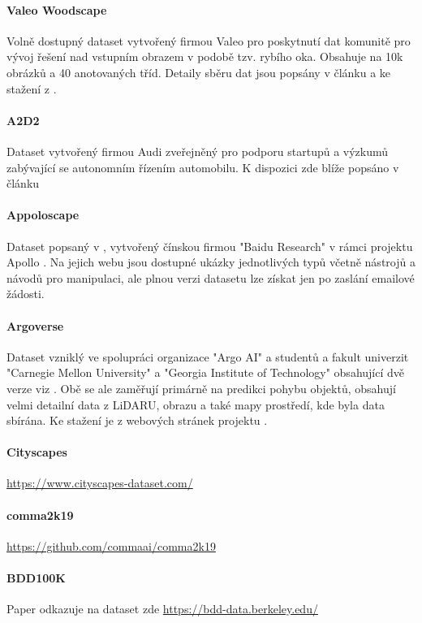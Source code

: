 \documentclass[czech, bc, kky, he, iso690numb]{fasthesis}
\begin{document}
    		\paragraph{Valeo Woodscape}
    			Volně dostupný dataset vytvořený firmou Valeo pro poskytnutí dat komunitě pro vývoj řešení nad vstupním obrazem v podobě tzv. rybího oka. Obsahuje na 10k obrázků a 40 anotovaných tříd. Detaily sběru dat jsou popsány v článku \cite{woodscape} a ke stažení z \cite{dataset_woodscape}.
    		\paragraph{A2D2}
    			Dataset vytvořený firmou Audi zveřejněný pro podporu startupů a výzkumů zabývající se autonomním řízením automobilu. K dispozici zde \cite{dataset_A2D2} blíže popsáno v článku \cite{a2d2}
    		\paragraph{Appoloscape}
    			Dataset popsaný v \cite{dataset_ApolloScape_paper}, vytvořený čínskou firmou "Baidu Research" v rámci projektu Apollo \cite{Apollo}. Na jejich webu \cite{dataset_ApolloScape} jsou dostupné ukázky jednotlivých typů včetně nástrojů a návodů pro manipulaci, ale plnou verzi datasetu lze získat jen po zaslání emailové žádosti.
    		\paragraph{Argoverse}
    			Dataset vzniklý ve spolupráci organizace "Argo AI" a studentů a fakult univerzit "Carnegie Mellon University" a "Georgia Institute of Technology"  obsahující dvě verze viz \cite{dataset_Argoverse1_paper, dataset_Argoverse2_paper}. Obě se ale zaměřují primárně na predikci pohybu objektů, obsahují velmi detailní data z LiDARU, obrazu a také mapy prostředí, kde byla data sbírána. Ke stažení je z webových stránek projektu \cite{dataset_Argoverse}.
   			\paragraph{Cityscapes}
   				\href{https://www.cityscapes-dataset.com/}{https://www.cityscapes-dataset.com/}
  			\paragraph{comma2k19}
  				\href{https://github.com/commaai/comma2k19}{https://github.com/commaai/comma2k19}
  			\paragraph{BDD100K}
  				Paper \cite{bdd100k} odkazuje na dataset zde \href{https://bdd-data.berkeley.edu/}{https://bdd-data.berkeley.edu/}
\end{document}
